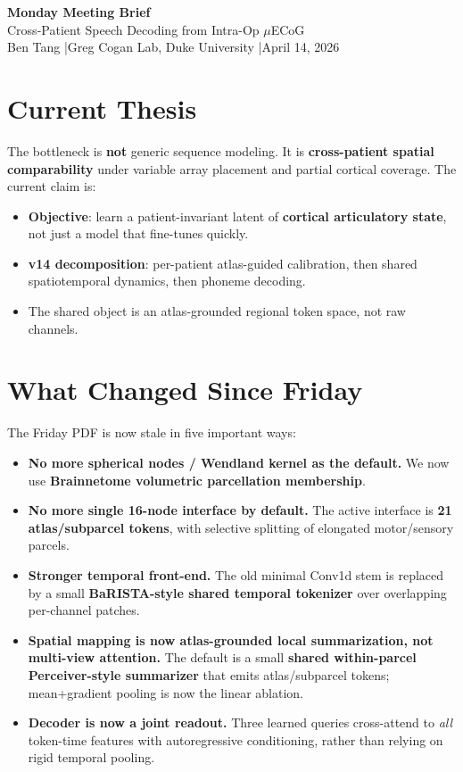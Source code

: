 \documentclass[10pt,letterpaper]{article}
\begin{document}
\setlength{\parindent}{0pt}
\setlength{\parskip}{0.3em}
\fontsize{10.4}{12.2}\selectfont

\begin{center}
{\Large\bfseries Monday Meeting Brief}\\[4pt]
{\normalsize Cross-Patient Speech Decoding from Intra-Op $\mu$ECoG}\\[6pt]
{\small Ben Tang \quad|\quad Greg Cogan Lab, Duke University \quad|\quad April 14, 2026}
\end{center}

\section{Current Thesis}

The bottleneck is \textbf{not} generic sequence modeling. It is \textbf{cross-patient spatial comparability} under variable array placement and partial cortical coverage. The current claim is:

\begin{itemize}
\item \textbf{Objective}: learn a patient-invariant latent of \textbf{cortical articulatory state}, not just a model that fine-tunes quickly.
\item \textbf{v14 decomposition}: per-patient atlas-guided calibration, then shared spatiotemporal dynamics, then phoneme decoding.
\item The shared object is an atlas-grounded regional token space, not raw channels.
\end{itemize}

\section{What Changed Since Friday}

The Friday PDF is now stale in five important ways:

\begin{itemize}
\item \textbf{No more spherical nodes / Wendland kernel as the default.} We now use \textbf{Brainnetome volumetric parcellation membership}.
\item \textbf{No more single 16-node interface by default.} The active interface is \textbf{21 atlas/subparcel tokens}, with selective splitting of elongated motor/sensory parcels.
\item \textbf{Stronger temporal front-end.} The old minimal Conv1d stem is replaced by a small \textbf{BaRISTA-style shared temporal tokenizer} over overlapping per-channel patches.
\item \textbf{Spatial mapping is now atlas-grounded local summarization, not multi-view attention.} The default is a small \textbf{shared within-parcel Perceiver-style summarizer} that emits atlas/subparcel tokens; mean+gradient pooling is now the linear ablation.
\item \textbf{Decoder is now a joint readout.} Three learned queries cross-attend to \emph{all} token-time features with autoregressive conditioning, rather than relying on rigid temporal pooling.
\end{itemize}
\end{document}
